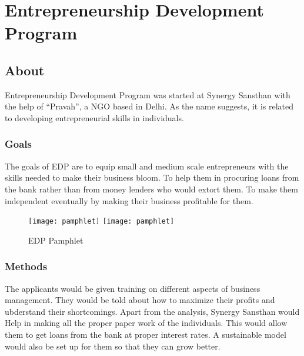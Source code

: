 \chapter{Entrepreneurship Development Program}
\ifpdf
    \graphicspath{{Chapter3/Chapter3Figs/PNG/}{Chapter3/Chapter3Figs/PDF/}{Chapter3/Chapter3Figs/}}
\else
    \graphicspath{{Chapter3/Chapter3Figs/EPS/}{Chapter3/Chapter3Figs/}}
\fi

\section{About}
Entrepreneurship Development Program was started at Synergy Sansthan with the help of ``Pravah'', a NGO based in Delhi. As the name suggests, it is related to developing entrepreneurial skills in individuals. 

\subsection{Goals}
The goals of EDP are to equip small and medium scale entrepreneurs with the skills needed to make their business bloom. To help them in procuring loans from the bank rather than from money lenders who would extort them. To make them independent eventually by making their business profitable for them.


\begin{figure}[ht!]
  \begin{center}
    \leavevmode
    \ifpdf
      \texttt{[image: pamphlet]}
    \else
      \texttt{[image: pamphlet]}
    \fi
    \caption{EDP Pamphlet}
    \label{FigAir}
  \end{center}
\end{figure}

\subsection{Methods}
The applicants would be given training on different aspects of business management. They would be told about how to maximize their profits and ubderstand their shortcomings. Apart from the analysis, Synergy Sansthan would Help in making all the proper paper work of the individuals. This would allow them to get loans from the bank at proper interest rates. A sustainable model would also be set up for them so that they can grow better.

